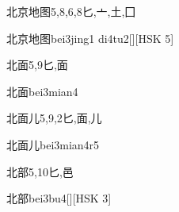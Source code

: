 \begin{Entry}{北京地图}{5,8,6,8}{⼔,⼇,⼟,⼞}
  \begin{Phonetics}{北京地图}{bei3jing1 di4tu2}[][HSK 5]
  \end{Phonetics}
\end{Entry}

\begin{Entry}{北面}{5,9}{⼔,⾯}
  \begin{Phonetics}{北面}{bei3mian4}
  \end{Phonetics}
\end{Entry}

\begin{Entry}{北面儿}{5,9,2}{⼔,⾯,⼉}
  \begin{Phonetics}{北面儿}{bei3mian4r5}
  \end{Phonetics}
\end{Entry}

\begin{Entry}{北部}{5,10}{⼔,⾢}
  \begin{Phonetics}{北部}{bei3bu4}[][HSK 3]
  \end{Phonetics}
\end{Entry}


